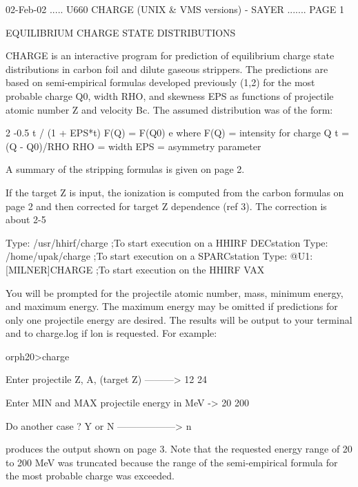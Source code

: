    02-Feb-02 ..... U660  CHARGE (UNIX & VMS versions) - SAYER ....... PAGE   1
 
 
                     EQUILIBRIUM CHARGE STATE DISTRIBUTIONS
 
   CHARGE  is  an  interactive  program  for  prediction of equilibrium charge
   state distributions in  carbon  foil  and  dilute  gaseous  strippers.  The
   predictions  are  based  on  semi-empirical  formulas  developed previously
   (1,2) for the most probable charge  Q0,  width  RHO,   and skewness  EPS as
   functions  of  projectile  atomic  number  Z  and velocity  Bc. The assumed
   distribution was of the form:
 
                                  2
                            -0.5 t / (1 + EPS*t)
              F(Q) = F(Q0) e
   where
              F(Q) = intensity for charge Q
                t  =  (Q - Q0)/RHO
               RHO = width
               EPS = asymmetry parameter
 
   A summary of the stripping formulas is given on page 2.
 
   If the target Z is input,  the  ionization  is  computed  from  the  carbon
   formulas  on  page  2  and  then corrected for target Z dependence (ref 3).
   The correction is about 2-5%
 
   Type:  /usr/hhirf/charge   ;To start execution on a HHIRF DECstation
   Type:  /home/upak/charge   ;To start execution on a SPARCstation
   Type:  @U1:[MILNER]CHARGE  ;To start execution on the HHIRF VAX
 
   You will be prompted  for  the  projectile  atomic  number,  mass,  minimum
   energy,  and  maximum  energy.    The  maximum  energy  may  be  omitted if
   predictions for only one projectile energy are desired.  The  results  will
   be  output  to  your  terminal  and  to charge.log if lon is requested. For
   example:
 
   orph20>charge
 
   Enter projectile  Z, A, (target Z) ---------> 12 24
 
   Enter MIN and MAX projectile energy in MeV -> 20 200
 
   Do another case ?  Y or N ------------------> n
 
   produces the output shown on page  3.    Note  that  the  requested  energy
   range  of  20  to  200  MeV  was  truncated  because  the  range   of   the
   semi-empirical formula for the most probable charge was exceeded.
 
